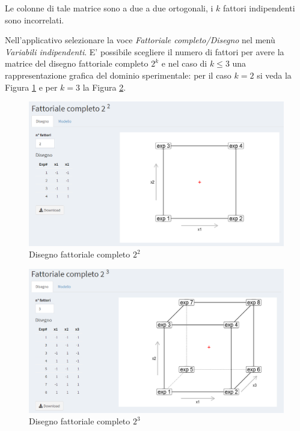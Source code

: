 \documentclass[
  11pt,
]{book}
\begin{document}
Le colonne di tale matrice sono a due a due ortogonali, i \(k\) fattori
indipendenti sono incorrelati.

Nell'applicativo selezionare la voce \emph{Fattoriale completo/Disegno} nel
menù \emph{Variabili indipendenti}. E' possibile scegliere il numero di
fattori per avere la matrice del disegno fattoriale completo \(2^k\) e nel
caso di \(k\leq 3\) una rappresentazione grafica del dominio sperimentale:
per il caso \(k=2\) si veda la Figura \ref{fig:fc1} e per \(k=3\) la
Figura \ref{fig:fc2}.

\begin{figure}

{\centering \includegraphics[width=1\linewidth]{Immagini/Fatt_compl/01_fattacompl2liv} 

}

\caption{Disegno fattoriale completo $2^2$}\label{fig:fc1}
\end{figure}

\begin{figure}

{\centering \includegraphics[width=1\linewidth]{Immagini/Fatt_compl/02_fattacompl3liv} 

}

\caption{Disegno fattoriale completo $2^3$}\label{fig:fc2}
\end{figure}
\end{document}

